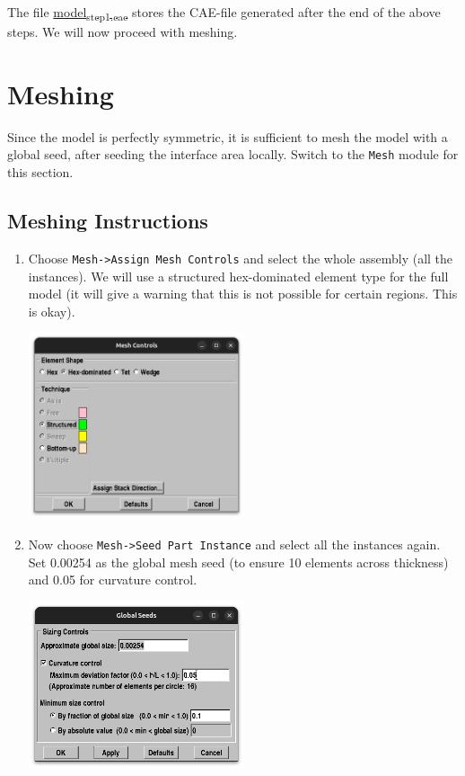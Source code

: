 \documentclass[11pt]{article}
\begin{document}
The file \href{https://github.com/Nidish96/Abaqus4Joints/blob/main/assets/assembly/model\_step1.cae}{model\textsubscript{step1.cae}} stores the CAE-file generated after the end of the above steps.
We will now proceed with meshing.
\section{Meshing}
\label{sec:org8647633}
Since the model is perfectly symmetric, it is sufficient to mesh the model with a global seed, after seeding the interface area locally.
Switch to the \texttt{Mesh} module for this section.
\subsection{Meshing Instructions}
\label{sec:org51040d4}
\begin{enumerate}
\item Choose \texttt{Mesh->Assign Mesh Controls} and select the whole assembly (all the instances).
We will use a structured hex-dominated element type for the full model (it will give a warning that this is not possible for certain regions. This is okay).
\begin{center}
\includegraphics[width=0.5\textwidth]{./figs/globmesh.png}
\end{center}
\item Now choose \texttt{Mesh->Seed Part Instance} and select all the instances again.
Set 0.00254 as the global mesh seed (to ensure 10 elements across thickness) and 0.05 for curvature control.
\begin{center}
\includegraphics[width=0.5\textwidth]{./figs/gmeshseed.png}

\end{center}
\end{enumerate}
\end{document}
